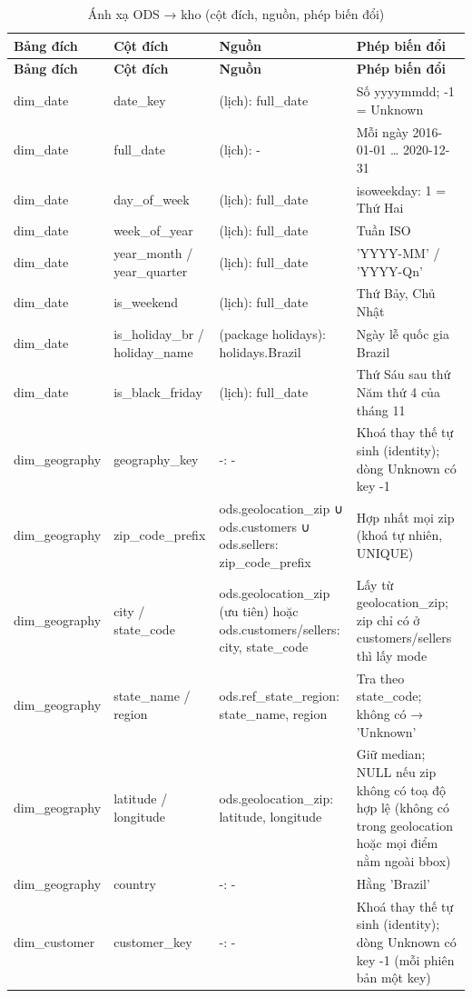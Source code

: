 {\small\begin{longtable}{p{2.4cm}p{3.1cm}p{3.6cm}p{5.4cm}}
\caption{Ánh xạ ODS → kho (cột đích, nguồn, phép biến đổi)}\label{tab:mapping}\\
\toprule
\textbf{Bảng đích} & \textbf{Cột đích} & \textbf{Nguồn} & \textbf{Phép biến đổi} \\
\midrule
\endfirsthead
\toprule
\textbf{Bảng đích} & \textbf{Cột đích} & \textbf{Nguồn} & \textbf{Phép biến đổi} \\
\midrule
\endhead
\bottomrule
\endfoot
dim\_date & date\_key & (lịch): full\_date & Số yyyymmdd; -1 = Unknown \\
dim\_date & full\_date & (lịch): - & Mỗi ngày 2016-01-01 … 2020-12-31 \\
dim\_date & day\_of\_week & (lịch): full\_date & isoweekday: 1 = Thứ Hai \\
dim\_date & week\_of\_year & (lịch): full\_date & Tuần ISO \\
dim\_date & year\_month / year\_quarter & (lịch): full\_date & 'YYYY-MM' / 'YYYY-Qn' \\
dim\_date & is\_weekend & (lịch): full\_date & Thứ Bảy, Chủ Nhật \\
dim\_date & is\_holiday\_br / holiday\_name & (package holidays): holidays.Brazil & Ngày lễ quốc gia Brazil \\
dim\_date & is\_black\_friday & (lịch): full\_date & Thứ Sáu sau thứ Năm thứ 4 của tháng 11 \\
dim\_geography & geography\_key & -: - & Khoá thay thế tự sinh (identity); dòng Unknown có key -1 \\
dim\_geography & zip\_code\_prefix & ods.geolocation\_zip ∪ ods.customers ∪ ods.sellers: zip\_code\_prefix & Hợp nhất mọi zip (khoá tự nhiên, UNIQUE) \\
dim\_geography & city / state\_code & ods.geolocation\_zip (ưu tiên) hoặc ods.customers/sellers: city, state\_code & Lấy từ geolocation\_zip; zip chỉ có ở customers/sellers thì lấy mode \\
dim\_geography & state\_name / region & ods.ref\_state\_region: state\_name, region & Tra theo state\_code; không có → 'Unknown' \\
dim\_geography & latitude / longitude & ods.geolocation\_zip: latitude, longitude & Giữ median; NULL nếu zip không có toạ độ hợp lệ (không có trong geolocation hoặc mọi điểm nằm ngoài bbox) \\
dim\_geography & country & -: - & Hằng 'Brazil' \\
dim\_customer & customer\_key & -: - & Khoá thay thế tự sinh (identity); dòng Unknown có key -1 (mỗi phiên bản một key) \\

\end{longtable}}
